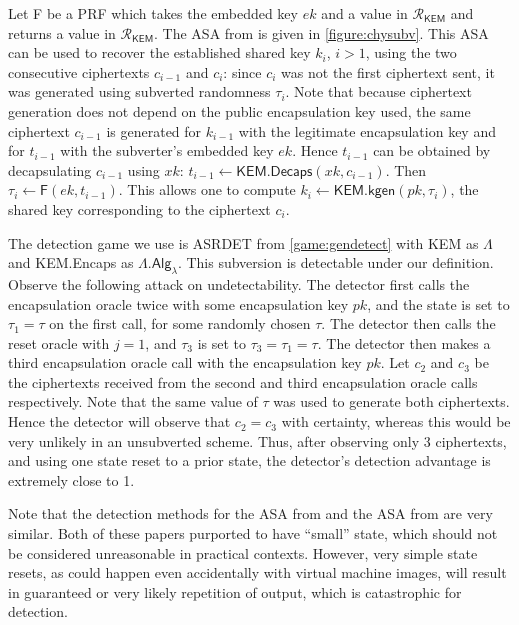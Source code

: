 Let \textsf{F} be a PRF which takes the embedded key $ek$ and a value in $\mathcal{R}_\mathsf{KEM}$ and returns a value in $\mathcal{R}_\mathsf{KEM}$. The ASA from \cite{AC:CheHuaYun20} is given in \autoref{figure:chysubv}. This ASA can be used to recover the established shared key $k_i$, $i>1$, using the two consecutive ciphertexts $c_{i-1}$ and $c_i$: since $c_i$ was not the first ciphertext sent, it was generated using subverted randomness $\tau_i$. Note that because ciphertext generation does not depend on the public encapsulation key used, the same ciphertext $c_{i-1}$ is generated for $k_{i-1}$ with the legitimate encapsulation key and for $t_{i-1}$ with the subverter's embedded key $ek$. Hence $t_{i-1}$ can be obtained by decapsulating $c_{i-1}$ using $xk$: $t_{i-1} \leftarrow \textsf{KEM.Decaps}(xk, c_{i-1})$. Then $\tau_i \leftarrow \textsf{F}(ek, t_{i-1})$. This allows one to compute $k_i \leftarrow \mathsf{KEM.kgen}(pk, \tau_i)$, the shared key corresponding to the ciphertext $c_i$.

The detection game we use is ASRDET from \autoref{game:gendetect} with \textsf{KEM} as $\mathsf{\Lambda}$ and \textsf{KEM.Encaps} as $\mathsf{\Lambda.Alg}_\lambda$. This subversion is detectable under our definition. Observe the following attack on undetectability. The detector first calls the encapsulation oracle twice with some encapsulation key $pk$, and the state is set to $\tau_1 = \tau$ on the first call, for some randomly chosen $\tau$. The detector then calls the reset oracle with $j=1$, and $\tau_3$ is set to $\tau_3=\tau_1 = \tau$. The detector then makes a third encapsulation oracle call with the encapsulation key $pk$. Let $c_2$ and $c_3$ be the ciphertexts received from the second and third encapsulation oracle calls respectively. Note that the same value of $\tau$ was used to generate both ciphertexts. Hence the detector will observe that $c_2=c_3$ with certainty, whereas this would be very unlikely in an unsubverted scheme. Thus, after observing only 3 ciphertexts, and using one state reset to a prior state, the detector's detection advantage is extremely close to 1.

Note that the detection methods for the ASA from \cite{BSKC2019} and the ASA from \cite{AC:CheHuaYun20} are very similar. Both of these papers purported to have ``small'' state, which should not be considered unreasonable in practical contexts. However, very simple state resets, as could happen even accidentally with virtual machine images, will result in guaranteed or very likely repetition of output, which is catastrophic for detection.


